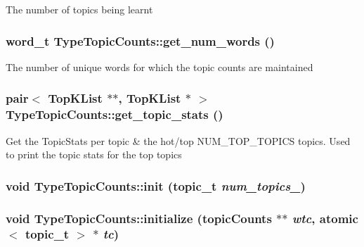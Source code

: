 \label{class_type_topic_counts_a443c1fcce5b88993cea9891137f9f5fa}
The number of topics being learnt \hypertarget{class_type_topic_counts_a18f351c45c28ebc4be0f0d3df001fde4}{
\subsubsection[{get\_\-num\_\-words}]{\setlength{\rightskip}{0pt plus 5cm}word\_\-t TypeTopicCounts::get\_\-num\_\-words ()}}
\label{class_type_topic_counts_a18f351c45c28ebc4be0f0d3df001fde4}
The number of unique words for which the topic counts are maintained \hypertarget{class_type_topic_counts_a0a41df650f7c2975f7517d02deb6d868}{
\subsubsection[{get\_\-topic\_\-stats}]{\setlength{\rightskip}{0pt plus 5cm}pair$<$ {\bf TopKList} $\ast$$\ast$, {\bf TopKList} $\ast$ $>$ TypeTopicCounts::get\_\-topic\_\-stats ()}}
\label{class_type_topic_counts_a0a41df650f7c2975f7517d02deb6d868}
Get the TopicStats per topic \& the hot/top NUM\_\-TOP\_\-TOPICS topics. Used to print the topic stats for the top topics \hypertarget{class_type_topic_counts_a6eb9abe7c1ca5cfeaf15d49b910fd24f}{
\subsubsection[{init}]{\setlength{\rightskip}{0pt plus 5cm}void TypeTopicCounts::init (topic\_\-t {\em num\_\-topics\_\-})}}
\label{class_type_topic_counts_a6eb9abe7c1ca5cfeaf15d49b910fd24f}
\hypertarget{class_type_topic_counts_ab788633dc25d325dc47bd333b87ae574}{
\subsubsection[{initialize}]{\setlength{\rightskip}{0pt plus 5cm}void TypeTopicCounts::initialize ({\bf topicCounts} $\ast$$\ast$ {\em wtc}, \/  atomic$<$ topic\_\-t $>$ $\ast$ {\em tc})}}
